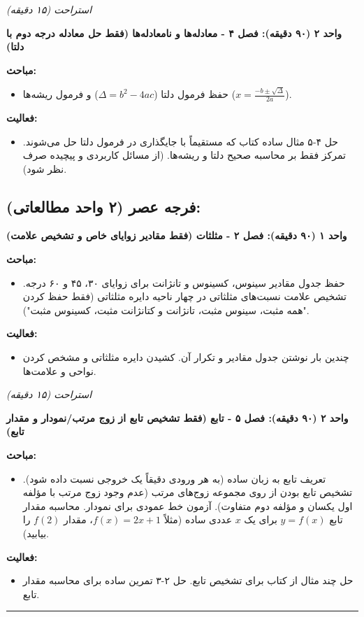 \documentclass[12pt,a4paper]{article}
\newcommand{\studyunit}[1]{\par\medskip\noindent\textbf{#1}\par\nopagebreak}
\newcommand{\topics}{\par\medskip\noindent\textbf{مباحث:}\begin{itemize}[nosep,after=\vspace{-0.5\baselineskip}]}
\newcommand{\activities}{\par\medskip\noindent\textbf{فعالیت:}\begin{itemize}[nosep,after=\vspace{-0.5\baselineskip}]}
\newcommand{\breaktime}[1]{\par\smallskip\centerline{\textit{#1}}\smallskip}
\begin{document}
    \breaktime{استراحت (۱۵ دقیقه)}

    \studyunit{واحد ۲ (۹۰ دقیقه): فصل ۴ - معادله‌ها و نامعادله‌ها (فقط حل معادله درجه دوم با دلتا)}
        \topics
            \item حفظ فرمول دلتا ($\Delta = b^2 - 4ac$) و فرمول ریشه‌ها ($x = \frac{-b \pm \sqrt{\Delta}}{2a}$).
        \end{itemize}
        \activities
            \item حل ۴-۵ مثال ساده کتاب که مستقیماً با جایگذاری در فرمول دلتا حل می‌شوند. تمرکز فقط بر محاسبه صحیح دلتا و ریشه‌ها. (از مسائل کاربردی و پیچیده صرف نظر شود).
        \end{itemize}

\subsection*{فرجه عصر (۲ واحد مطالعاتی):}
    \studyunit{واحد ۱ (۹۰ دقیقه): فصل ۲ - مثلثات (فقط مقادیر زوایای خاص و تشخیص علامت)}
        \topics
            \item حفظ جدول مقادیر سینوس، کسینوس و تانژانت برای زوایای ۳۰، ۴۵ و ۶۰ درجه. تشخیص علامت نسبت‌های مثلثاتی در چهار ناحیه دایره مثلثاتی (فقط حفظ کردن "همه مثبت، سینوس مثبت، تانژانت و کتانژانت مثبت، کسینوس مثبت").
        \end{itemize}
        \activities
            \item چندین بار نوشتن جدول مقادیر و تکرار آن. کشیدن دایره مثلثاتی و مشخص کردن نواحی و علامت‌ها.
        \end{itemize}

    \breaktime{استراحت (۱۵ دقیقه)}

    \studyunit{واحد ۲ (۹۰ دقیقه): فصل ۵ - تابع (فقط تشخیص تابع از زوج مرتب/نمودار و مقدار تابع)}
        \topics
            \item تعریف تابع به زبان ساده (به هر ورودی دقیقاً یک خروجی نسبت داده شود). تشخیص تابع بودن از روی مجموعه زوج‌های مرتب (عدم وجود زوج مرتب با مؤلفه اول یکسان و مؤلفه دوم متفاوت). آزمون خط عمودی برای نمودار. محاسبه مقدار تابع $y=f(x)$ برای یک $x$ عددی ساده (مثلاً $f(x)=2x+1$، مقدار $f(2)$ را بیابید).
        \end{itemize}
        \activities
            \item حل چند مثال از کتاب برای تشخیص تابع. حل ۲-۳ تمرین ساده برای محاسبه مقدار تابع.
        \end{itemize}

\rule{\linewidth}{0.4pt}\vspace{1em}
\end{document}
